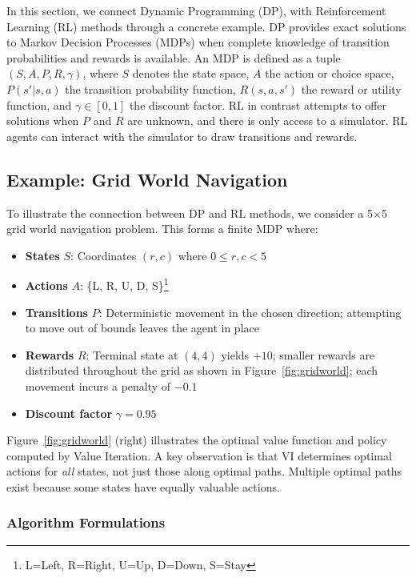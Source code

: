 In this section, we connect Dynamic Programming (DP), with Reinforcement Learning (RL) methods through a concrete example. DP provides exact solutions to Markov Decision Processes (MDPs) when complete knowledge of transition probabilities and rewards is available. An MDP is defined as a tuple $(S, A, P, R, \gamma)$, where $S$ denotes the state space, $A$ the action or choice space, $P(s'|s,a)$ the transition probability function, $R(s,a,s')$ the reward or utility function, and $\gamma \in [0,1]$ the discount factor. RL in contrast attempts to offer solutions when $P$ and $R$ are unknown, and there is only access to a simulator. RL agents can interact with the simulator to draw transitions and rewards.  


\subsection{Example: Grid World Navigation}

To illustrate the connection between DP and RL methods, we consider a 5$\times$5 grid world navigation problem. This forms a finite MDP where:

\begin{itemize}
\item \textbf{States} $S$: Coordinates $(r,c)$ where $0 \leq r,c < 5$
\item \textbf{Actions} $A$: \{L, R, U, D, S\}\footnote{L=Left, R=Right, U=Up, D=Down, S=Stay}
\item \textbf{Transitions} $P$: Deterministic movement in the chosen direction; attempting to move out of bounds leaves the agent in place
\item \textbf{Rewards} $R$: Terminal state at $(4,4)$ yields $+10$; smaller rewards are distributed throughout the grid as shown in Figure~\ref{fig:gridworld}; each movement incurs a penalty of $-0.1$
\item \textbf{Discount factor} $\gamma = 0.95$
\end{itemize}


Figure~\ref{fig:gridworld} (right) illustrates the optimal value function and policy computed by Value Iteration. A key observation is that VI determines optimal actions for \textit{all} states, not just those along optimal paths. Multiple optimal paths exist because some states have equally valuable actions.

\subsubsection{Algorithm Formulations}

